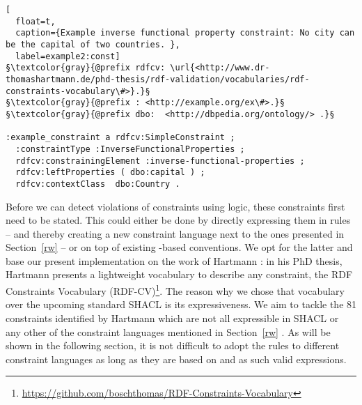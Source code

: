 \begin{lstlisting}[
  float=t,
  caption={Example inverse functional property constraint: No city can be the capital of two countries. },
  label=example2:const]
§\textcolor{gray}{@prefix rdfcv: \url{<http://www.dr-thomashartmann.de/phd-thesis/rdf-validation/vocabularies/rdf-constraints-vocabulary\#>}.}§
§\textcolor{gray}{@prefix : <http://example.org/ex\#>.}§
§\textcolor{gray}{@prefix dbo: 	<http://dbpedia.org/ontology/> .}§

:example_constraint a rdfcv:SimpleConstraint ;
  :constraintType :InverseFunctionalProperties ;
  rdfcv:constrainingElement :inverse-functional-properties ;
  rdfcv:leftProperties ( dbo:capital ) ;
  rdfcv:contextClass  dbo:Country .
\end{lstlisting}

Before we can detect violations of constraints using \nthree logic,
these constraints first need to be stated.
This could either be done by directly expressing them in 
rules -- and thereby creating
a new constraint language next to the ones presented in Section~\ref{rw} -- or on top of existing \rdf-based conventions. 
We opt for the latter and base our present implementation on the work of Hartmann \cite[p.167 ff]{hartmann2016}:
in his PhD thesis, Hartmann presents a lightweight vocabulary to describe any constraint, 
the RDF Constraints Vocabulary (RDF-CV)\footnote{\url{https://github.com/boschthomas/RDF-Constraints-Vocabulary}}. The reason why we chose that vocabulary over 
the upcoming standard
SHACL is its expressiveness. We aim to tackle the 81 constraints identified by Hartmann which are not all expressible in SHACL 
or any other of the constraint languages
mentioned in Section~\ref{rw} \cite[p.52, appendix]{hartmann2016}. As will be shown in the following section, it is not difficult to adopt the rules to different 
constraint languages as long as they are based on \rdf and as such valid \nthree expressions.

